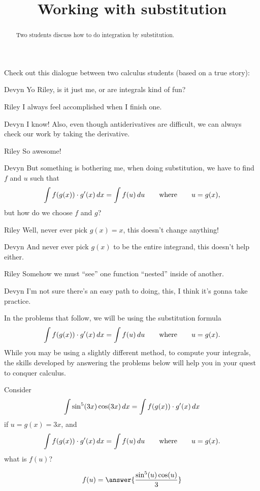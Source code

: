 \documentclass{ximera}
\title[Break-Ground:]{Working with substitution}
\begin{document}
\begin{abstract}
Two students discuss how to do integration by substitution.
\end{abstract}
\maketitle

Check out this dialogue between two calculus students (based on a true
story):

\begin{dialogue}
\item[Devyn] Yo Riley, is it just me, or are integrals kind of fun?
\item[Riley] I always feel accomplished when I finish one.
\item[Devyn] I know! Also, even though antiderivatives are difficult,
  we can always check our work by taking the derivative.
\item[Riley] So awesome!
\item[Devyn] But something is bothering me, when doing substitution,
  we have to find $f$ and $u$ such that
  \[
  \int f(g(x)) \cdot g'(x) \,d x = \int f(u) \,d u\qquad\text{where}\qquad u = g(x),
  \]
  but how do we choose $f$ and $g$?
\item[Riley] Well, never ever pick $g(x) = x$, this doesn't change
    anything!
\item[Devyn] And never ever pick $g(x)$ to be the entire integrand,
  this doesn't help either.
\item[Riley] Somehow we must ``see'' one function ``nested'' inside of
  another.
\item[Devyn] I'm not sure there's an easy path to doing, this, I think
  it's gonna take practice.
\end{dialogue}


In the problems that follow, we will be using the substitution formula
\[
   \int f(g(x)) \cdot g'(x) \,d x = \int f(u) \,d
   u\qquad\text{where}\qquad u = g(x).
\]
While you may be using a slightly different method, to compute your
integrals, the skills developed by answering the problems below will
help you in your quest to conquer calculus.

\begin{problem}
  Consider
  \[
  \int \sin^5(3x) \cos(3x) \,d x = \int f(g(x)) \cdot g'(x) \,d x
  \]
  if $u = g(x) = 3x$, and 
  \[
  \int f(g(x)) \cdot g'(x) \,d x = \int f(u) \,d
  u\qquad\text{where}\qquad u = g(x).
  \]
  what is $f(u)$?
  \begin{prompt}
    \[
    f(u) = \answer{
      \frac{\sin^5(u) \cos(u)}{3}}
    \]
  \end{prompt}
\end{problem}
\end{document}
